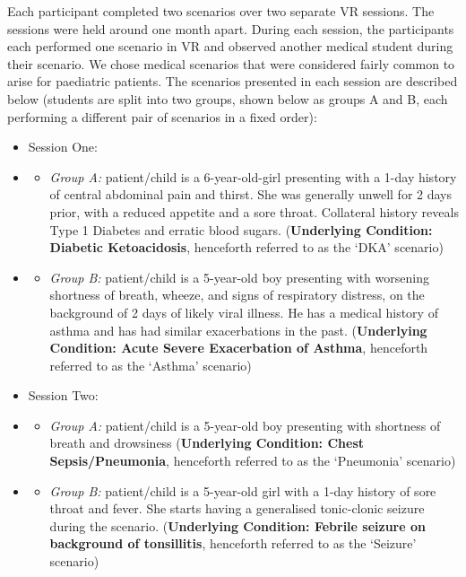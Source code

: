 \documentclass[a4paper, nobind]{templates/ociamthesis}
\providecommand{\tightlist}{%
  \setlength{\itemsep}{0pt}\setlength{\parskip}{0pt}}
\begin{document}
\hfill\break
Each participant completed two scenarios over two separate VR sessions. The sessions were held around one month apart. During each session, the participants each performed one scenario in VR and observed another medical student during their scenario. We chose medical scenarios that were considered fairly common to arise for paediatric patients. The scenarios presented in each session are described below (students are split into two groups, shown below as groups A and B, each performing a different pair of scenarios in a fixed order):

\begin{itemize}
\tightlist
\item
  Session One:
\item
  \begin{itemize}
  \tightlist
  \item
    \emph{Group A:} patient/child is a 6-year-old-girl presenting with a 1-day history of central abdominal pain and thirst. She was generally unwell for 2 days prior, with a reduced appetite and a sore throat. Collateral history reveals Type 1 Diabetes and erratic blood sugars. (\textbf{Underlying Condition: Diabetic Ketoacidosis}, henceforth referred to as the `DKA' scenario)
  \end{itemize}
\item
  \begin{itemize}
  \tightlist
  \item
    \emph{Group B:} patient/child is a 5-year-old boy presenting with worsening shortness of breath, wheeze, and signs of respiratory distress, on the background of 2 days of likely viral illness. He has a medical history of asthma and has had similar exacerbations in the past. (\textbf{Underlying Condition: Acute Severe Exacerbation of Asthma}, henceforth referred to as the `Asthma' scenario)
  \end{itemize}
\item
  Session Two:
\item
  \begin{itemize}
  \tightlist
  \item
    \emph{Group A:} patient/child is a 5-year-old boy presenting with shortness of breath and drowsiness (\textbf{Underlying Condition: Chest Sepsis/Pneumonia}, henceforth referred to as the `Pneumonia' scenario)
  \end{itemize}
\item
  \begin{itemize}
  \tightlist
  \item
    \emph{Group B:} patient/child is a 5-year-old girl with a 1-day history of sore throat and fever. She starts having a generalised tonic-clonic seizure during the scenario. (\textbf{Underlying Condition: Febrile seizure on background of tonsillitis}, henceforth referred to as the `Seizure' scenario)
  \end{itemize}
\end{itemize}
\end{document}
